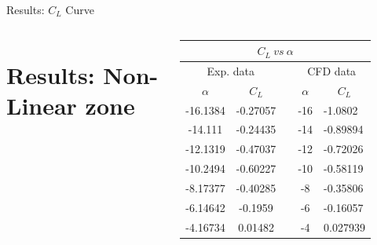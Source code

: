 \documentclass[english,10pt,a4paper,twoside]{beamer}
\begin{document}
\begin{frame}[shrink = 65]{Results: $C_L$ Curve}
\begin{columns}[T]
		\section{Results: Non-Linear zone}
		\begin{table}[H]
			\centering
			\begin{tabular}{|ccccl|}
				\hline
				\multicolumn{5}{|c|}{$C_L ~ vs~  \alpha$}                                                                                                                           \\ \hline
				\multicolumn{2}{|c|}{Exp. data}                                & \multicolumn{1}{c|}{}          & \multicolumn{2}{c|}{CFD data}                                 \\ \cline{1-2} \cline{4-5} 
				\multicolumn{1}{|c|}{$\alpha$} & \multicolumn{1}{c|}{$C_L$}    & \multicolumn{1}{c|}{}          & \multicolumn{1}{c|}{$\alpha$} & \multicolumn{1}{c|}{$C_L$}    \\ \cline{1-2} \cline{4-5} 
				\multicolumn{1}{|c|}{-16.1384} & \multicolumn{1}{c|}{-0.27057} & \multicolumn{1}{c|}{}          & \multicolumn{1}{c|}{-16}      & -1.0802                       \\ \cline{1-2} \cline{4-5} 
				\multicolumn{1}{|c|}{-14.111}  & \multicolumn{1}{c|}{-0.24435} & \multicolumn{1}{c|}{}          & \multicolumn{1}{c|}{-14}      & -0.89894                      \\ \cline{1-2} \cline{4-5} 
				\multicolumn{1}{|c|}{-12.1319} & \multicolumn{1}{c|}{-0.47037} & \multicolumn{1}{l|}{}          & \multicolumn{1}{c|}{-12}      & -0.72026                      \\ \cline{1-2} \cline{4-5} 
				\multicolumn{1}{|c|}{-10.2494} & \multicolumn{1}{c|}{-0.60227} & \multicolumn{1}{c|}{\textbf{}} & \multicolumn{1}{c|}{-10}      & -0.58119                      \\ \cline{1-2} \cline{4-5} 
				\multicolumn{1}{|c|}{-8.17377} & \multicolumn{1}{c|}{-0.40285} & \multicolumn{1}{c|}{}          & \multicolumn{1}{c|}{-8}       & -0.35806                      \\ \cline{1-2} \cline{4-5} 
				\multicolumn{1}{|c|}{-6.14642} & \multicolumn{1}{c|}{-0.1959}  & \multicolumn{1}{c|}{}          & \multicolumn{1}{c|}{-6}       & -0.16057                      \\ \cline{1-2} \cline{4-5} 
				\multicolumn{1}{|c|}{-4.16734} & \multicolumn{1}{c|}{0.01482}  & \multicolumn{1}{c|}{}          & \multicolumn{1}{c|}{-4}       & 0.027939                      \\ \cline{1-2} \cline{4-5} 

\end{tabular}
\end{table}
\end{columns}
\end{frame}
\end{document}
